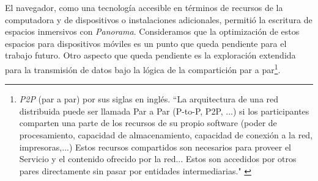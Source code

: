 


El navegador, como una tecnología accesible en términos de recursos de la computadora y de dispositivos o instalaciones adicionales, permitió la escritura de espacios inmersivos con \textit{Panorama}. Consideramos que la optimización de estos espacios para dispositivos móviles es un punto que queda pendiente para el trabajo futuro. Otro aspecto que queda pendiente es la exploración extendida para la transmisión de datos bajo la lógica de la compartición par a par\footnote{\textit{P2P} (par a par) por sus siglas en inglés.  ``La arquitectura de una red distribuida puede ser llamada Par a Par (P-to-P, P2P, ...)   si los participantes comparten una parte de los recursos de su propio software (poder de procesamiento, capacidad de almacenamiento, capacidad de conexión a la red, impresoras,...) Estos recursos compartidos son necesarios para proveer el Servicio y el contenido ofrecido por la red... Estos son accedidos por otros pares directamente sin pasar por entidades intermediarias." \citep{p2p}}. 

